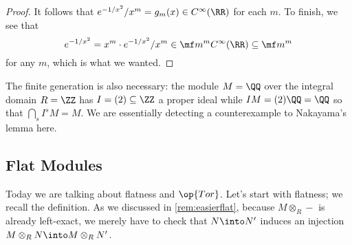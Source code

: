 \begin{proof}
	It follows that $e^{-1/x^2}/x^m=g_m(x)\in C^\infty(\RR)$ for each $m$. To finish, we see that
	\[e^{-1/x^2}=x^m\cdot e^{-1/x^2}/x^m\in\mf m^mC^\infty(\RR)\subseteq\mf m^m\]
	for any $m$, which is what we wanted.
\end{proof}
\begin{remark}[Nir]
	The finite generation is also necessary: the module $M=\QQ$ over the integral domain $R=\ZZ$ has $I=(2)\subseteq\ZZ$ a proper ideal while $IM=(2)\QQ=\QQ$ so that $\bigcap_sI^sM=M$. We are essentially detecting a counterexample to Nakayama's lemma here.
\end{remark}

\subsection{Flat Modules}
Today we are talking about flatness and $\op{Tor}$. Let's start with flatness; we recall the definition.
\flatdefi*
\noindent As we discussed in \autoref{rem:easierflat}, because $M\otimes_R-$ is already left-exact, we merely have to check that $N\into N'$ induces an injection $M\otimes_RN\into M\otimes_RN'$.

